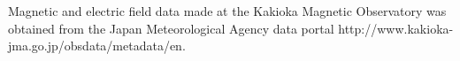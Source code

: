\documentclass[draft,linenumbers]{agujournal2018}
\begin{document}
%




%
%
%
%
%
%
%
%


\acknowledgments
Magnetic and electric field data made at the Kakioka Magnetic Observatory was obtained from the Japan Meteorological Agency data portal http://www.kakioka-jma.go.jp/obsdata/metadata/en.


%

%




\end{document}
